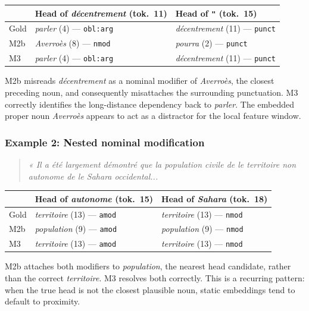 \documentclass[12pt,letterpaper]{article}
\begin{document}
\begin{center}
\small
\begin{tabular}{lll}
\toprule
& \textbf{Head of \textit{décentrement} (tok.\ 11)} & \textbf{Head of \texttt{"} (tok.\ 15)} \\
\midrule
Gold  & \textit{parler} (4) — \texttt{obl:arg} & \textit{décentrement} (11) — \texttt{punct} \\
M2b   & \textit{Averroès} (8) — \texttt{nmod}  & \textit{pourra} (2) — \texttt{punct} \\
M3    & \textit{parler} (4) — \texttt{obl:arg} & \textit{décentrement} (11) — \texttt{punct} \\
\bottomrule
\end{tabular}
\end{center}
\FloatBarrier
M2b misreads \textit{décentrement} as a nominal modifier of \textit{Averroès}, the closest preceding noun, and consequently misattaches the surrounding punctuation. M3 correctly identifies the long-distance dependency back to \textit{parler}. The embedded proper noun \textit{Averroès} appears to act as a distractor for the local feature window.

\subsubsection*{Example 2: Nested nominal modification}

\begin{quote}
\textit{« Il a été largement démontré que la population civile de le territoire non autonome de le Sahara occidental...}
\end{quote}

\begin{center}
\small
\begin{tabular}{lll}
\toprule
& \textbf{Head of \textit{autonome} (tok.\ 15)} & \textbf{Head of \textit{Sahara} (tok.\ 18)} \\
\midrule
Gold  & \textit{territoire} (13) — \texttt{amod} & \textit{territoire} (13) — \texttt{nmod} \\
M2b   & \textit{population} (9) — \texttt{amod}  & \textit{population} (9) — \texttt{nmod} \\
M3    & \textit{territoire} (13) — \texttt{amod} & \textit{territoire} (13) — \texttt{nmod} \\
\bottomrule
\end{tabular}
\end{center}
\FloatBarrier
M2b attaches both modifiers to \textit{population}, the nearest head candidate, rather than the correct \textit{territoire}. M3 resolves both correctly. This is a recurring pattern: when the true head is not the closest plausible noun, static embeddings tend to default to proximity.
\end{document}

